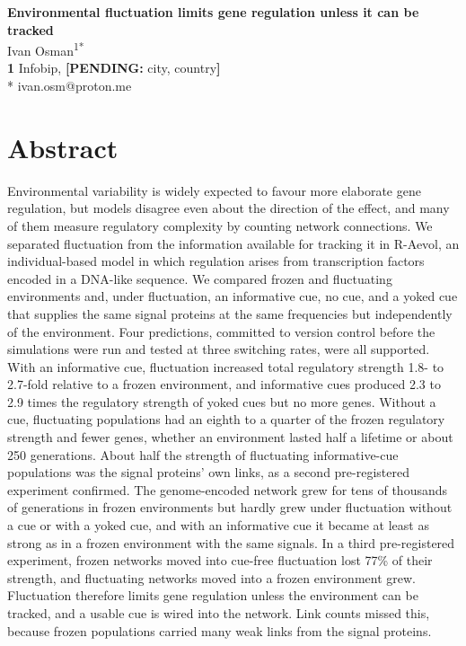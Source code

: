 \documentclass[10pt,letterpaper]{article}
\newcommand{\pending}[1]{{\color{pend}\textbf{[PENDING:} #1\textbf{]}}}
\begin{document}
\vspace*{0.2in}

\begin{flushleft}
{\Large
\textbf{Environmental fluctuation limits gene regulation unless it can be tracked}
}
\newline
\\
Ivan Osman\textsuperscript{1*}
\\
\bigskip
\textbf{1} Infobip, \pending{city, country}
\\
\bigskip
* ivan.osm@proton.me
\end{flushleft}

\section*{Abstract}
Environmental variability is widely expected to favour more elaborate gene
regulation, but models disagree even about the direction of the effect, and
many of them measure regulatory complexity by counting network connections. We
separated fluctuation from the information available for tracking it in
R-Aevol, an individual-based model in which regulation arises from transcription
factors encoded in a DNA-like sequence. We compared frozen and fluctuating
environments and, under fluctuation, an informative cue, no cue, and a yoked cue
that supplies the same signal proteins at the same frequencies but independently
of the environment. Four predictions, committed to version control before the
simulations were run and tested at three switching rates, were all supported.
With an informative cue, fluctuation increased total regulatory strength 1.8- to
2.7-fold relative to a frozen environment, and informative cues produced 2.3 to
2.9 times the regulatory strength of yoked cues but no more genes. Without a cue,
fluctuating populations had an eighth to a quarter of the frozen regulatory
strength and fewer genes, whether an environment lasted half a lifetime or about 250
generations. About half the strength of fluctuating informative-cue populations was the
signal proteins' own links, as a second pre-registered experiment confirmed. The
genome-encoded network grew for tens of thousands of generations in frozen
environments but hardly grew under fluctuation without a cue or with a yoked
cue, and with an informative cue it became at least as strong as in a frozen
environment with the same signals. In a third pre-registered experiment, frozen
networks moved into cue-free fluctuation lost 77\% of their strength, and
fluctuating networks moved into a frozen environment grew. Fluctuation therefore
limits gene regulation unless the environment can be tracked, and a usable cue is
wired into the network. Link counts missed this, because frozen populations
carried many weak links from the signal proteins.
\end{document}
